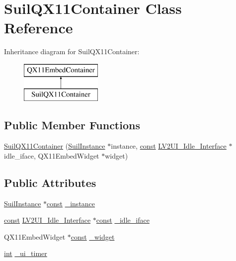 \hypertarget{class_suil_q_x11_container}{}\section{Suil\+Q\+X11\+Container Class Reference}
\label{class_suil_q_x11_container}
Inheritance diagram for Suil\+Q\+X11\+Container\+:\begin{figure}[H]
\begin{center}
\leavevmode
\includegraphics[height=2.000000cm]{class_suil_q_x11_container}
\end{center}
\end{figure}
\subsection*{Public Member Functions}
\begin{DoxyCompactItemize}
\item 
\hyperlink{class_suil_q_x11_container_aaa0a51ff410713487734bf2aa32fb6bf}{Suil\+Q\+X11\+Container} (\hyperlink{group__suil_ga767e978a8c5f7c0d5246da79c9b97c6b}{Suil\+Instance} $\ast$instance, \hyperlink{getopt1_8c_a2c212835823e3c54a8ab6d95c652660e}{const} \hyperlink{ui_8h_aa14419a503e167dc9be27288536e4f81}{L\+V2\+U\+I\+\_\+\+Idle\+\_\+\+Interface} $\ast$idle\+\_\+iface, Q\+X11\+Embed\+Widget $\ast$widget)
\end{DoxyCompactItemize}
\subsection*{Public Attributes}
\begin{DoxyCompactItemize}
\item 
\hyperlink{group__suil_ga767e978a8c5f7c0d5246da79c9b97c6b}{Suil\+Instance} $\ast$\hyperlink{getopt1_8c_a2c212835823e3c54a8ab6d95c652660e}{const} \hyperlink{class_suil_q_x11_container_af352fbcf9dd9d8d85309ef4cb28f3ba7}{\+\_\+instance}
\item 
\hyperlink{getopt1_8c_a2c212835823e3c54a8ab6d95c652660e}{const} \hyperlink{ui_8h_aa14419a503e167dc9be27288536e4f81}{L\+V2\+U\+I\+\_\+\+Idle\+\_\+\+Interface} $\ast$\hyperlink{getopt1_8c_a2c212835823e3c54a8ab6d95c652660e}{const} \hyperlink{class_suil_q_x11_container_af4e0f4288de32cfba1cda0c9d0092d7a}{\+\_\+idle\+\_\+iface}
\item 
Q\+X11\+Embed\+Widget $\ast$\hyperlink{getopt1_8c_a2c212835823e3c54a8ab6d95c652660e}{const} \hyperlink{class_suil_q_x11_container_a45a6b3c136256dbd163ad5c148db908c}{\+\_\+widget}
\item 
\hyperlink{xmltok_8h_a5a0d4a5641ce434f1d23533f2b2e6653}{int} \hyperlink{class_suil_q_x11_container_abb99c31ab2dba1ec9eea3ef48ca7a9e0}{\+\_\+ui\+\_\+timer}
\end{DoxyCompactItemize}


